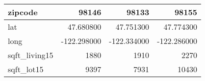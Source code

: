 \begin{table}[H]
\begin{tabular}{|l|r|r|r|}
\hline zipcode & \cellcolor[rgb]{0.9, 0.54, 0.52} 98146 & 98133 & 98155 \\
\hline lat & \cellcolor[rgb]{0.9, 0.54, 0.52} 47.680800 & 47.751300 & 47.774300 \\
\hline long & \cellcolor[rgb]{0.9, 0.54, 0.52} -122.298000 & \cellcolor[rgb]{0.9, 0.54, 0.52} -122.334000 & \cellcolor[rgb]{0.9, 0.54, 0.52} -122.286000 \\
\hline sqft\_living15 & \cellcolor[rgb]{0.9, 0.54, 0.52} 1880 & 1910 & 2270 \\
\hline sqft\_lot15 & \cellcolor[rgb]{0.9, 0.54, 0.52} 9397 & 7931 & 10430 \\
\hline
\end{tabular}
\end{table}
